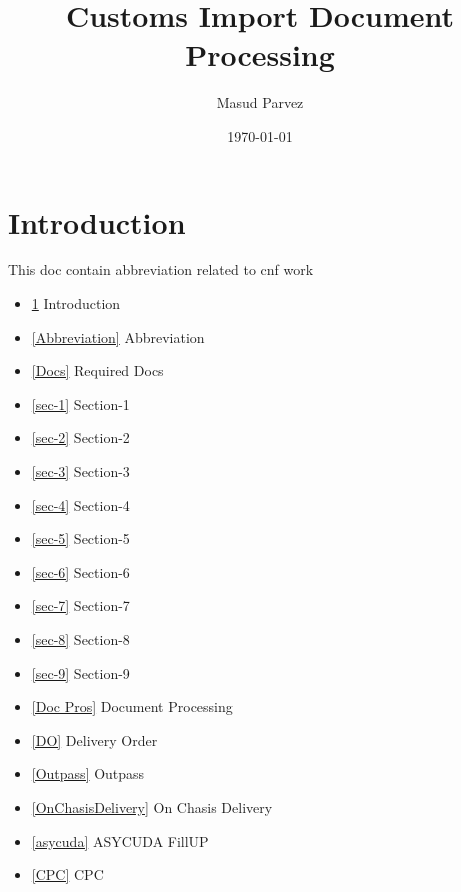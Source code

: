 \documentclass[10pt]{article}
\author{ Masud Parvez }
\title{Customs Import Document Processing}
\date{\today}
\begin{document}
\maketitle

\section{Introduction}\label{Introduction}
This doc contain abbreviation
related to cnf work

\begin{itemize}
    \item \ref{Introduction} Introduction
    \item \ref{Abbreviation} Abbreviation
    \item \ref{Docs} Required Docs
    \item \ref{sec-1} Section-1
    \item \ref{sec-2} Section-2
    \item \ref{sec-3} Section-3
    \item \ref{sec-4} Section-4
    \item \ref{sec-5} Section-5
    \item \ref{sec-6} Section-6
    \item \ref{sec-7} Section-7
    \item \ref{sec-8} Section-8
    \item \ref{sec-9} Section-9
    \item \ref{Doc Pros} Document Processing
    \item \ref{DO} Delivery Order
    \item \ref{Outpass} Outpass
    \item \ref{OnChasisDelivery} On Chasis Delivery
    \item \ref{asycuda} ASYCUDA FillUP
    \item \ref{CPC} CPC
\end{itemize}
\end{document}

